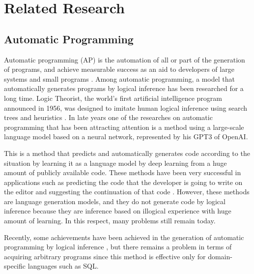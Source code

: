 \documentclass{article}
\begin{document}
\section{Related Research}
\subsection{Automatic Programming}
\label{sec:headings}
Automatic programming (AP) is the automation of all or part of the generation of programs, and achieve measurable success as an aid to developers of large systems and small programs \cite{AutomaticProgramming}. 
Among automatic programming, a model that automatically generates programs by logical inference has been researched for a long time.
Logic Theorist, the world's first artificial intelligence program announced in 1956, was designed to imitate human logical inference using search trees and heuristics \cite{LogicTheorist}.
In late years one of the researches on automatic programming that has been attracting attention is a method using a large-scale language model based on a neural network, represented by his GPT3\cite{gpt3} of OpenAI.

This is a method that predicts and automatically generates code according to the situation by learning it as a language model by deep learning from a huge amount of publicly available code.
These methods have been very successful in applications such as predicting the code that the developer is going to write on the editor and suggesting the continuation of that code \cite{copilot}.
However, these methods are language generation models, and they do not generate code by logical inference because they are inference based on illogical experience with huge amount of learning.
In this respect, many problems still remain today.

Recently, some achievements have been achieved in the generation of automatic programming by logical inference \cite{palsql}, but there remains a problem in terms of acquiring arbitrary programs since this method is effective only for domain-specific languages such as SQL.
\end{document}

